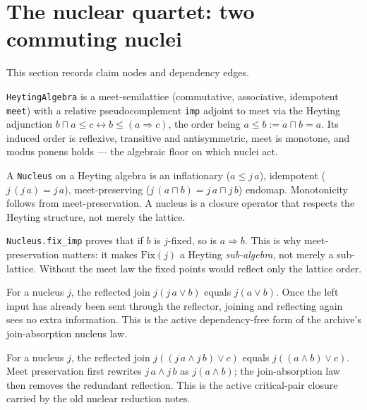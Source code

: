 \section{The nuclear quartet: two commuting nuclei}

This section records claim nodes and dependency edges.

\begin{proposition}\label{thm:heyting}\leanok{}
\texttt{HeytingAlgebra} is a meet-semilattice (commutative, associative, idempotent \texttt{meet}) with a relative pseudocomplement \texttt{imp} adjoint to meet via the Heyting adjunction $b \sqcap a \leq c \leftrightarrow b \leq (a \Rightarrow c)$, the order being $a \leq b := a \sqcap b = a$. Its induced order is reflexive, transitive and antisymmetric, meet is monotone, and modus ponens holds --- the algebraic floor on which nuclei act.
\end{proposition}
\begin{proposition}[Nucleus]\label{thm:nucleus}\leanok{}
A \texttt{Nucleus} on a Heyting algebra is an inflationary ($a \leq j\,a$), idempotent ($j\,(j\,a) = j\,a$), meet-preserving ($j\,(a \sqcap b) = j\,a \sqcap j\,b$) endomap. Monotonicity follows from meet-preservation. A nucleus is a closure operator that respects the Heyting structure, not merely the lattice.
\end{proposition}
\begin{theorem}\label{thm:fix-imp}\leanok{}
\texttt{Nucleus.fix\_imp} proves that if $b$ is $j$-fixed, so is $a \Rightarrow b$. This is why meet-preservation matters: it makes $\mathrm{Fix}(j)$ a Heyting \emph{sub-algebra}, not merely a sub-lattice. Without the meet law the fixed points would reflect only the lattice order.
\end{theorem}
\begin{theorem}\label{thm:nucleus-absorb-join}\leanok{}
For a nucleus $j$, the reflected join $j(j\,a \vee b)$ equals $j(a \vee b)$.
Once the left input has already been sent through the reflector, joining and
reflecting again sees no extra information. This is the active dependency-free
form of the archive's join-absorption nucleus law.
\end{theorem}
\begin{theorem}\label{thm:nucleus-absorb-join-meet}\leanok{}
For a nucleus $j$, the reflected join
$j((j\,a \wedge j\,b)\vee c)$ equals $j((a\wedge b)\vee c)$.
Meet preservation first rewrites $j\,a\wedge j\,b$ as $j(a\wedge b)$;
the join-absorption law then removes the redundant reflection. This is the
active critical-pair closure carried by the old nuclear reduction notes.
\end{theorem}
